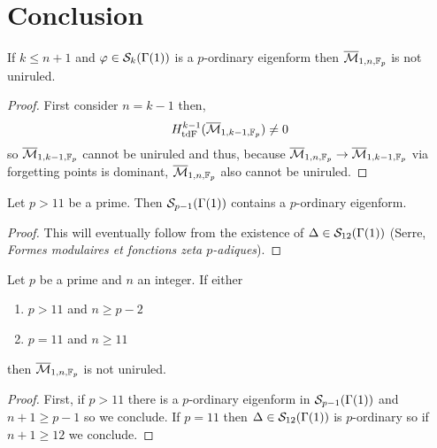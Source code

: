 \documentclass[12pt]{article}
\begin{document}
\section{Conclusion}

\begin{prop}
If $k \le n + 1$ and $\varphi \in \S_k(\Gamma(1))$ is a $p$-ordinary eigenform then $\barM_{1,n, \ff_p}$ is not uniruled.
\end{prop}

\begin{proof}
First consider $n = k - 1$ then,
\[ H_{\tdF}^{k-1}(\barM_{1,k-1,\ff_p}) \neq 0 \]
so $\barM_{1,k-1,\ff_p}$ cannot be uniruled and thus, because $\barM_{1,n,\ff_p} \to \barM_{1,k-1,\ff_p}$ via forgetting points is dominant, $\barM_{1,n,\ff_p}$ also cannot be uniruled.
\end{proof}

\begin{prop}
Let $p > 11$ be a prime. Then $\S_{p-1}(\Gamma(1))$ contains a $p$-ordinary eigenform.
\end{prop}

\begin{proof}
This will eventually follow from the existence of $\Delta \in \S_{12}(\Gamma(1))$ (Serre, \textit{Formes modulaires et fonctions zeta $p$-adiques}).
\end{proof}

\begin{theorem}
Let $p$ be a prime and $n$ an integer. If either
\begin{enumerate}
\item $p > 11$ and $n \ge p - 2$
\item $p = 11$ and $n \ge 11$ 
\end{enumerate}
then $\barM_{1,n, \ff_p}$ is not uniruled.
\end{theorem}

\begin{proof}
First, if $p > 11$ there is a $p$-ordinary eigenform in $\S_{p-1}(\Gamma(1))$ and $n + 1 \ge p - 1$ so we conclude. If $p = 11$ then $\Delta \in \S_{12}(\Gamma(1))$ is $p$-ordinary so if $n + 1 \ge 12$ we conclude.
\end{proof}
\end{document}
